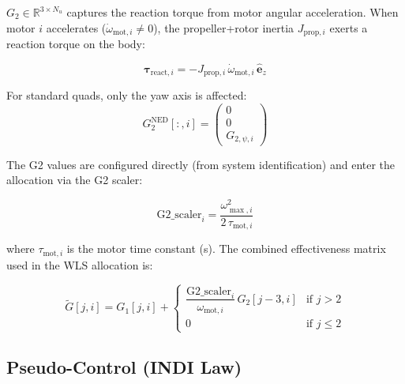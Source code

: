 \documentclass[11pt]{article}
\newcommand{\ned}{\mathrm{NED}}
\begin{document}
$G_2 \in \mathbb{R}^{3 \times N_u}$ captures the reaction torque from motor angular
acceleration. When motor $i$ accelerates ($\dot{\omega}_{\mathrm{mot},i} \neq 0$),
the propeller+rotor inertia $J_{\mathrm{prop},i}$ exerts a reaction torque on the body:

\begin{equation}
    \bm{\tau}_{\mathrm{react},i} = -J_{\mathrm{prop},i} \, \dot{\omega}_{\mathrm{mot},i} \, \hat{\bm{e}}_z
\end{equation}

For standard quads, only the yaw axis is affected:
\begin{equation}\label{eq:g2_ned}
    G_2^{\ned}[:,i] = \begin{pmatrix} 0 \\ 0 \\ G_{2,\psi,i} \end{pmatrix}
\end{equation}

The G2 values are configured directly (from system identification) and enter the
allocation via the G2 scaler:

\begin{equation}
    \text{G2\_scaler}_i = \frac{\omega_{\max,i}^2}{2 \, \tau_{\mathrm{mot},i}}
\end{equation}

where $\tau_{\mathrm{mot},i}$ is the motor time constant (s). The combined
effectiveness matrix used in the WLS allocation is:

\begin{equation}\label{eq:g1g2_combined}
    \widetilde{G}[j,i] = G_1[j,i] + \begin{cases}
        \dfrac{\text{G2\_scaler}_i}{\omega_{\mathrm{mot},i}} \, G_2[j-3,i]
            & \text{if } j > 2 \\[6pt]
        0 & \text{if } j \le 2
    \end{cases}
\end{equation}

\subsection{Pseudo-Control (INDI Law)}
\end{document}
